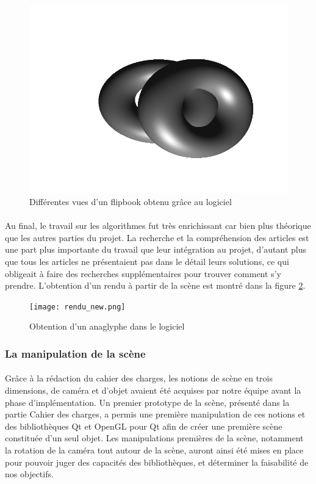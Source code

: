 \begin{figure}[H]
    \includegraphics[scale=0.2]{testGif8.png}
	\caption{\label{fig:flipbook_logiciel} Différentes vues d'un flipbook obtenu grâce au logiciel \protect}
\end{figure}

\paragraph{}
Au final, le travail sur les algorithmes fut très enrichissant car bien plus théorique que les autres parties du projet. La recherche et la compréhension des articles est une part plus importante du travail que leur intégration au projet, d'autant plus que tous les articles ne présentaient pas dans le détail leurs solutions, ce qui obligeait à faire des recherches supplémentaires pour trouver comment s'y prendre. L'obtention d'un rendu à partir de la scène est montré dans la figure \ref{fig:screenRendu}.

\begin{figure}[h]
	\centering
	\texttt{[image: rendu\_new.png]}
	\caption{\label{fig:screenRendu} Obtention d'un anaglyphe dans le logiciel \protect}
\end{figure}

\subsubsection{La manipulation de la scène}
\paragraph{}
Grâce à la rédaction du cahier des charges, les notions de scène en trois dimensions, de caméra et d'objet avaient été acquises par notre équipe avant la phase d'implémentation. Un premier prototype de la scène, présenté dans la partie Cahier des charges, a permis une première manipulation de ces notions et des bibliothèques Qt et OpenGL pour Qt afin de créer une première scène constituée d'un seul objet. Les manipulations premières de la scène, notamment la rotation de la caméra tout autour de la scène, auront ainsi été mises en place pour pouvoir juger des capacités des bibliothèques, et déterminer la faisabilité de nos objectifs.

